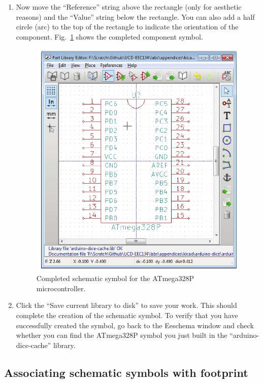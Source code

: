 \documentclass[12pt,letterpaper]{scrartcl}
\begin{document}
\begin{enumerate}
	\item Now move the ``Reference'' string above the rectangle (only for aesthetic reasons) and the ``Value'' string below the rectangle. You can also add a half circle (arc) to the top of the rectangle to indicate the orientation of the component. Fig.~\ref{fig:atmega328p-symbol-final} shows the completed component symbol. 
		\begin{figure}[h]
			\centering
			\includegraphics{atmega328p-symbol-final.pdf}
			\caption{Completed schematic symbol for the ATmega328P microcontroller.}
			\label{fig:atmega328p-symbol-final}
		\end{figure}
		
	\item Click the “Save current library to disk” to save your work. This should complete the creation of the schematic symbol. To verify that you have successfully created the symbol, go back to the Eeschema window and check whether you can find the ATmega328P symbol you just built in the ``arduino-dice-cache'' library. 
	
\end{enumerate}

\newpage
\subsection{Associating schematic symbols with footprint}
\label{sec:cvpcb}
\end{document}

